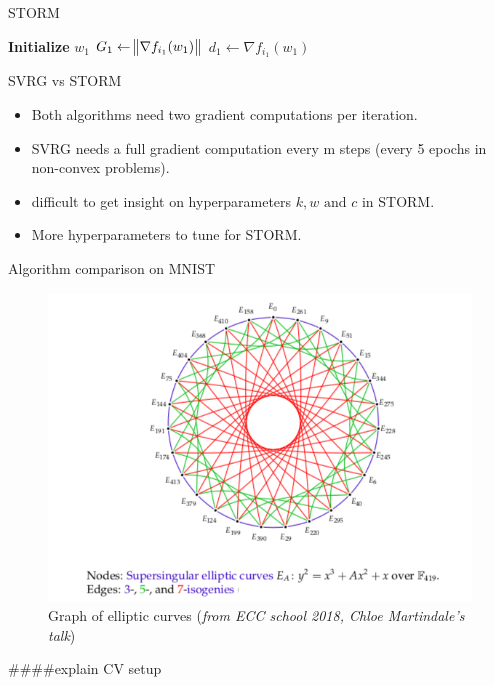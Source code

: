\documentclass[10pt]{beamer}
\begin{document}
\begin{frame}{STORM}
    \begin{algorithm}[H]
        \DontPrintSemicolon
        \SetAlgoNoLine

        \textbf{Initialize} $w_1$\;
        $G_1 \gets \norm {\nabla f_{i_1}(w_1)}$\;
        $d_1 \gets \nabla f_{i_1}(w_1)$\;
        \caption{{\textsc{STORM Procedure}}}
        \label{algo:storm}
    \end{algorithm}
\end{frame}


\begin{frame}{SVRG vs STORM}
\begin{itemize}
    \item Both algorithms need two gradient computations per iteration.
    \item SVRG needs a full gradient computation every m steps (every 5 epochs in non-convex problems).
    \item difficult to get insight on hyperparameters $k,w \text{ and } c$ in STORM.
    \item More hyperparameters to tune for STORM.
\end{itemize}
\end{frame}

\begin{frame}{Algorithm comparison on MNIST}
\begin{figure}
    \centering
\includegraphics[scale=0.5]{images/Capture d’écran 2020-10-30 à 17.50.11.png}
     \caption{Graph of elliptic curves (\textit{from ECC school 2018, Chloe Martindale's talk})}
    \label{fig:my_label}
\end{figure}   
\end{frame}
####explain CV setup
\end{document}

